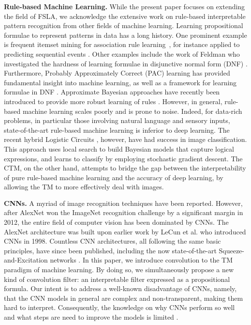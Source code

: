 \documentclass{article}
\begin{document}
\textbf{Rule-based Machine Learning.}
While the present paper focuses on extending the field of FSLA, we acknowledge the extensive work on rule-based interpretable pattern recognition from other fields of machine learning. Learning propositional formulae to represent patterns in data has a long history. One prominent example is frequent itemset mining for association rule learning~\cite{Agrawal1993}, for instance applied to predicting sequential events \cite{rudin13,mccormick15}.  Other examples include the work of Feldman who investigated the hardness of learning formulae in disjunctive normal form (DNF) \cite{feldman9}. Furthermore, Probably Approximately Correct (PAC) learning has provided fundamental insight into machine learning, as well as a framework for learning formulae in DNF \cite{valiant12}. Approximate Bayesian approaches have recently been introduced to provide more robust learning of rules \cite{wang6,hauser13}.  However, in general, rule-based machine learning scales poorly and is prone to noise. Indeed, for data-rich problems, in particular those involving natural language and sensory inputs, state-of-the-art rule-based machine learning is inferior to deep learning.
The recent hybrid Logistic Circuits \cite{LiangAAAI19}, however, have had success in image classification. This approach uses local search to build Bayesian models that capture logical expressions, and learns to classify by employing stochastic gradient descent.
The CTM, on the other hand, attempts to bridge the gap between the interpretability of pure rule-based machine learning and the accuracy of deep learning, by allowing the TM to more effectively deal with images.

\textbf{CNNs.} A myriad of image recognition techniques have been reported. However, after AlexNet won the ImageNet recognition challenge by a significant margin in 2012, the entire field of computer vision has been dominated by CNNs. The AlexNet architecture was built upon earlier work by LeCun et al. \cite{lecun1998gradient}  who introduced CNNs in 1998. Countless CNN architectures, all following the same basic principles, have since been published, including the now state-of-the-art Squeeze-and-Excitation networks  \cite{hu2018squeeze}. In this paper, we introduce convolution to the TM paradigm of machine learning. By doing so, we simultaneously propose a new kind of convolution filter: an interpretable filter expressed as a  propositional formula. Our intent is to address a well-known disadvantage of CNNs, namely, that the CNN models in general are complex and non-transparent, making them hard to interpret. Consequently, the knowledge on why CNNs perform so well and what steps are need to improve the models is limited \cite{zeiler2014visualizing}.
\end{document}
